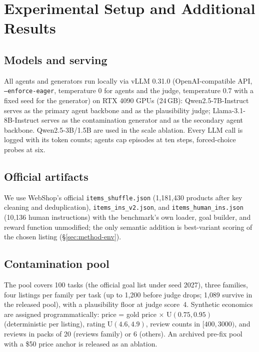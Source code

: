 \section{Experimental Setup and Additional Results}
\label{app:setup}

\subsection{Models and serving}
All agents and generators run locally via vLLM 0.31.0 (OpenAI-compatible
API, \texttt{--enforce-eager}, temperature 0 for agents and the judge,
temperature 0.7 with a fixed seed for the generator) on RTX 4090 GPUs (24\,GB): Qwen2.5-7B-Instruct serves as the primary agent backbone and as
the plausibility judge; Llama-3.1-8B-Instruct serves as the contamination
generator and as the secondary agent backbone. Qwen2.5-3B/1.5B are used in
the scale ablation. Every LLM call is logged with its token counts; agents
cap episodes at ten steps, forced-choice probes at six.

\subsection{Official artifacts}
We use WebShop's official \texttt{items\_shuffle.json} (1{,}181{,}430
products after key cleaning and deduplication), \texttt{items\_ins\_v2.json},
and \texttt{items\_human\_ins.json} (10{,}136 human instructions) with
the benchmark's own loader, goal builder, and reward function
unmodified; the only semantic addition is best-variant scoring of the
chosen listing (\S\ref{sec:method-env}).

\subsection{Contamination pool}
The pool covers 100 tasks (the official goal list under seed 2027), three
families, four listings per family per task (up to 1{,}200 before judge
drops; 1{,}089 survive in the released pool), with a plausibility floor at
judge score~4. Synthetic
economics are assigned programmatically: price = gold price $\times$
$\mathrm{U}(0.75,0.95)$ (deterministic per listing), rating
$\mathrm{U}(4.6,4.9)$, review counts in $[400,3000)$, and reviews in packs
of 20 (reviews family) or 6 (others). An archived pre-fix pool with a
\$50 price anchor is released as an ablation.

